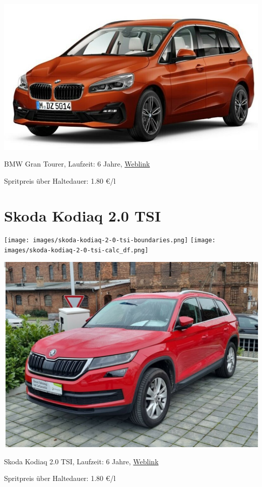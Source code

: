 \documentclass[landscape, DIV=99, 14pt]{scrartcl}
\begin{document}
\pagebreak
\null
\vspace{2cm}
\begin{center}
\includegraphics[width=0.9\columnwidth]{cars/bmw-gran-tourer.png}

BMW Gran Tourer, Laufzeit: 6 Jahre, \href{https://suchen.mobile.de/fahrzeuge/details.html?id=336851737}{Weblink}

Spritpreis \"uber Haltedauer: 1.80 \euro{}/l

\end{center}

\pagebreak


\twocolumn

\section*{Skoda Kodiaq 2.0 TSI}
\begin{center}
\texttt{[image: images/skoda-kodiaq-2-0-tsi-boundaries.png]}
\null
\vspace{0.5cm}
\texttt{[image: images/skoda-kodiaq-2-0-tsi-calc\_df.png]}
\end{center}

\pagebreak
\null
\vspace{2cm}
\begin{center}
\includegraphics[width=0.9\columnwidth]{cars/skoda-kodiaq-2p0-tsi.png}

Skoda Kodiaq 2.0 TSI, Laufzeit: 6 Jahre, \href{https://suchen.mobile.de/fahrzeuge/details.html?id=336695573}{Weblink}

Spritpreis \"uber Haltedauer: 1.80 \euro{}/l

\end{center}
\end{document}
